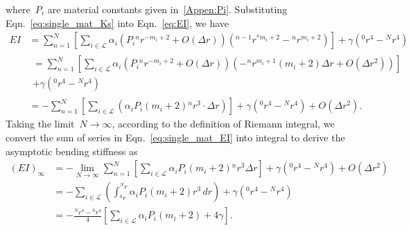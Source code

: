 \documentclass[preprint,10pt,times]{elsarticle}
\numberwithin{equation}{section}
\renewcommand{\>}{$\Rightarrow$}
\begin{document}
where~$P_i$ are material constants given in~\ref{Appen:Pi}. Substituting Eqn.~\eqref{eq:single_mat_Ks} into Eqn.~\eqref{eq:EI}, we have
\begin{equation}
	\begin{aligned}
	EI & = \sum_{n=1}^{N} \left[ \sum_{i \in \mathcal{L}} \alpha_i \left( P_i {}^{n}\!{r}^{-m_i + 2} + O(\Delta r) \right) ({}^{n-1}\!{r}^{{}^{n}\!{m_{i}}+2} - {}^{n}\!{r}^{m_{i}+2}) \right] + \gamma ({}^{0}\!{r}^4 - {}^{N}\!{r}^4) \\
	 & \begin{split}
		= \sum_{n=1}^{N} \left[ \sum_{i \in \mathcal{L}} \alpha_i \left( P_i {}^{n}\!{r}^{-m_i + 2} + O(\Delta r) \right) (- {}^{n}\!{r}^{m_{i}+1}(m_i + 2 ) \Delta r + O(\Delta r^2)) \right] \\
		+ \gamma ({}^{0}\!{r}^4 - {}^{N}\!{r}^4)
	   \end{split}\\
	 & = - \sum_{n=1}^{N} \left[ \sum_{i \in \mathcal{L}} \left( \alpha_i P_i (m_i + 2 ) {}^{n}\!{r}^{3} \cdot \Delta r \right) \right] + \gamma ({}^{0}\!{r}^4 - {}^{N}\!{r}^4) + O(\Delta r^2).
	\end{aligned}
	\label{eq:single_mat_EI}
\end{equation}
Taking the limit~$N \to \infty$, according to the definition of Riemann integral, we convert the sum of series in Eqn.~\eqref{eq:single_mat_EI} into integral to derive the asymptotic bending stiffness as
\begin{equation}
	\begin{aligned}
	(EI)_{\infty} & = - \lim\limits_{N \to \infty} \sum_{n=1}^{N} \left[ \sum_{i \in \mathcal{L}} \alpha_i P_i (m_i + 2 ) {}^{n}\!{r}^{3} \Delta r \right] + \gamma ({}^{0}\!{r}^4 - {}^{N}\!{r}^4) + O(\Delta r^2) \\
	 & = - \sum_{i \in \mathcal{L}} \left( \int_{{}^{0}\!{r}}^{{}^{N}\!{r}} \alpha_i P_i (m_i + 2 ) r^3 \, dr \right) + \gamma ({}^{0}\!{r}^4 - {}^{N}\!{r}^4) \\
	 & = - \frac{{}^{N}\!{r}^4 - {}^{0}\!{r}^4}{4} \left[ \sum_{i \in \mathcal{L}} \alpha_i P_i (m_i + 2 ) + 4\gamma\right].
	\end{aligned}
	\label{eq:single_mat_EI_final}
\end{equation}



\end{document}

